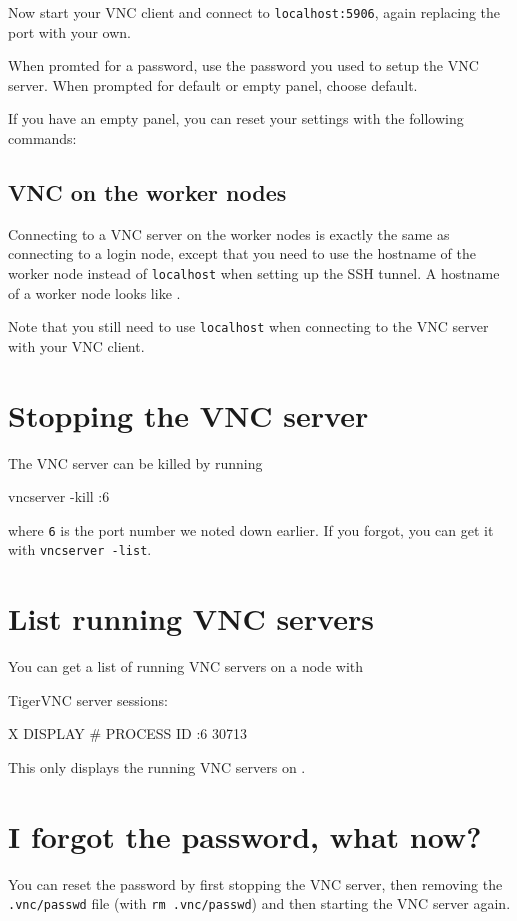 Now start your VNC client and connect to \lstinline|localhost:5906|, again replacing
the port with your own.

When promted for a password, use the password you used to setup the VNC server.
When prompted for default or empty panel, choose default.

If you have an empty panel, you can reset your settings with the following commands:

\begin{prompt}
\end{prompt}

\subsection{VNC on the worker nodes}

Connecting to a VNC server on the worker nodes is exactly the same as connecting
to a login node, except that you need to use the hostname of the worker node instead of
\lstinline|localhost| when setting up the SSH tunnel. A hostname of a worker node looks like
\texttt{\computenode{}}.

Note that you still need to use \lstinline|localhost| when connecting to the VNC server
with your VNC client.

\section{Stopping the VNC server}

The VNC server can be killed by running

\begin{prompt}
vncserver -kill :6
\end{prompt}

where \lstinline|6| is the port number we noted down earlier. If you forgot,
you can get it with \lstinline|vncserver -list|.

\section{List running VNC servers}

You can get a list of running VNC servers on a node with

\begin{prompt}
TigerVNC server sessions:

X DISPLAY #	PROCESS ID
:6		    30713
\end{prompt}

This only displays the running VNC servers on .

\section{I forgot the password, what now?}

You can reset the password by first stopping the VNC server, then removing
the \lstinline|.vnc/passwd| file (with \lstinline|rm .vnc/passwd|) and then
starting the VNC server again.
